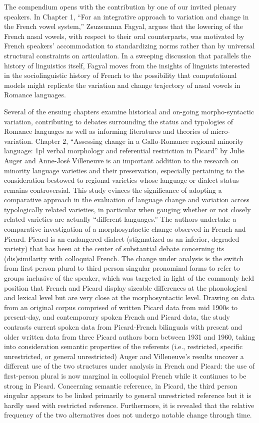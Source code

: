 \documentclass[output=paper,draftmode]{langscibook}
\begin{document}
The compendium opens with the contribution by one of our invited plenary speakers. In Chapter 1, “For an integrative approach to variation and change in the French vowel system,” Zsuzsuanna Fagyal, argues that the lowering of the French nasal vowels, with respect to their oral counterparts, was motivated by French speakers’ accommodation to standardizing norms rather than by universal structural constraints on articulation. In a sweeping discussion that parallels the history of linguistics itself, Fagyal moves from the insights of linguists interested in the sociolinguistic history of French to the possibility that computational models might replicate the variation and change trajectory of nasal vowels in Romance languages.

Several of the ensuing chapters examine historical and on-going morpho-syn\-tac\-tic variation, contributing to debates surrounding the status and typologies of Romance languages as well as informing literatures and theories of micro-variation. Chapter 2, “Assessing change in a Gallo-Romance regional minority language: 1pl verbal morphology and referential restriction in Picard” by Julie Auger and Anne-José Villeneuve is an important addition to the research on minority language varieties and their preservation, especially pertaining to the consideration bestowed to regional varieties whose language or dialect status remains controversial. This study evinces the significance of adopting a comparative approach in the evaluation of language change and variation across typologically related varieties, in particular when gauging whether or not closely related varieties are actually “different languages.” The authors undertake a comparative investigation of a morphosyntactic change observed in French and Picard. Picard is an endangered dialect (stigmatized as an inferior, degraded variety) that has been at the center of substantial debate concerning its (dis)similarity with colloquial French. The change under analysis is the switch from first person plural to third person singular pronominal forms to refer to groups inclusive of the speaker, which was targeted in light of the commonly held position that French and Picard display sizeable differences at the phonological and lexical level but are very close at the morphosyntactic level. Drawing on data from an original corpus comprised of written Picard data from mid 1900s to present-day, and contemporary spoken French and Picard data, the study contrasts current spoken data from Picard-French bilinguals with present and older written data from three Picard authors born between 1931 and 1960, taking into consideration semantic properties of the referents (i.e., restricted, specific unrestricted, or general unrestricted) Auger and Villeneuve’s results uncover a different use of the two structures under analysis in French and Picard: the use of first-person plural is now marginal in colloquial French while it continues to be strong in Picard. Concerning semantic reference, in Picard, the third person singular appears to be linked primarily to general unrestricted reference but it is hardly used with restricted reference. Furthermore, it is revealed that the relative frequency of the two alternatives does not undergo notable change through time.
\end{document}
